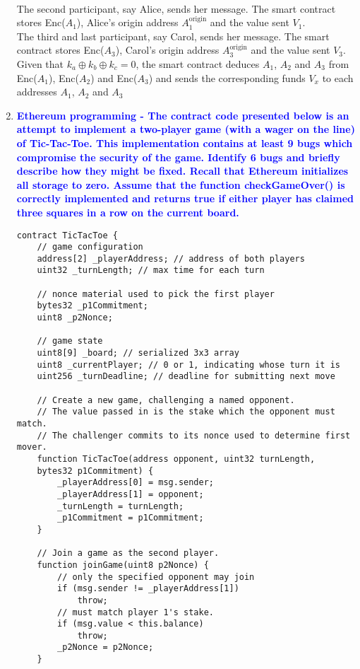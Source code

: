 \documentclass[11pt]{article}
\begin{document}
\begin{enumerate}
    \\ The second participant, say Alice, sends her message. The smart contract stores Enc($A_1$), Alice's origin address $A_1^\text{origin}$ and the value sent $V_1$.
    \\ The third and last participant, say Carol, sends her message. The smart contract stores Enc($A_3$), Carol's origin address $A_3^\text{origin}$ and the value sent $V_3$.
    \\ Given that $k_a \oplus k_b \oplus k_c = 0$, the smart contract deduces $A_1$, $A_2$ and $A_3$ from Enc($A_1$), Enc($A_2$) and Enc($A_3$) and sends the corresponding funds $V_x$ to each addresses $A_1$, $A_2$ and $A_3$
    

\item \textbf{\textcolor{blue}{Ethereum programming - The contract code presented below is an attempt to implement a two-player game (with a wager on the line) of Tic-Tac-Toe. This implementation contains at least 9 bugs which compromise the security of the game. Identify 6 bugs and briefly describe how they might be fixed. Recall that Ethereum initializes all storage to zero. Assume that the function checkGameOver() is correctly implemented and returns true if either player has claimed three squares in a row on the current board.}}
\begin{verbatim}
contract TicTacToe {
    // game configuration
    address[2] _playerAddress; // address of both players
    uint32 _turnLength; // max time for each turn

    // nonce material used to pick the first player
    bytes32 _p1Commitment;
    uint8 _p2Nonce;

    // game state
    uint8[9] _board; // serialized 3x3 array
    uint8 _currentPlayer; // 0 or 1, indicating whose turn it is
    uint256 _turnDeadline; // deadline for submitting next move

    // Create a new game, challenging a named opponent.
    // The value passed in is the stake which the opponent must match.
    // The challenger commits to its nonce used to determine first mover.
    function TicTacToe(address opponent, uint32 turnLength,
    bytes32 p1Commitment) {
        _playerAddress[0] = msg.sender;
        _playerAddress[1] = opponent;
        _turnLength = turnLength;
        _p1Commitment = p1Commitment;
    }

    // Join a game as the second player.
    function joinGame(uint8 p2Nonce) {
        // only the specified opponent may join
        if (msg.sender != _playerAddress[1])
            throw;
        // must match player 1's stake.
        if (msg.value < this.balance)
            throw;
        _p2Nonce = p2Nonce;
    }


\end{verbatim}
\end{enumerate}
\end{document}
